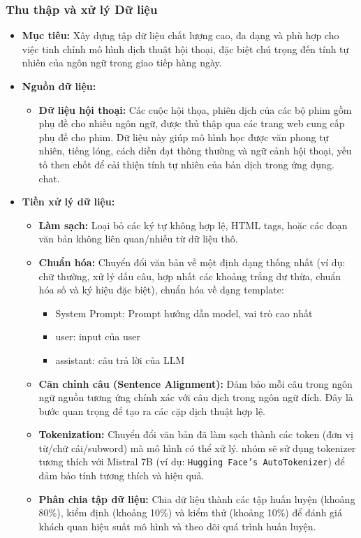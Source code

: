 \subsubsection{Thu thập và xử lý Dữ liệu}
\begin{itemize}
    \item \textbf{Mục tiêu:} Xây dựng tập dữ liệu chất lượng cao, đa dạng và phù hợp cho việc tinh chỉnh mô hình dịch thuật hội thoại, đặc biệt chú trọng đến tính tự nhiên của ngôn ngữ trong giao tiếp hàng ngày.
    \item \textbf{Nguồn dữ liệu:}
    \begin{itemize}
        \item \textbf{Dữ liệu hội thoại:} Các cuộc hội thọa, phiên dịch của các bộ phim gồm phụ đề cho nhiều ngôn ngữ, được thủ thập qua các trang web cung cấp phụ đề cho phim. Dữ liệu này giúp mô hình học được văn phong tự nhiên, tiếng lóng, cách diễn đạt thông thường và ngữ cảnh hội thoại, yếu tố then chốt để cải thiện tính tự nhiên của bản dịch trong ứng dụng.
chat.
    \end{itemize}
    \item \textbf{Tiền xử lý dữ liệu:}
    \begin{itemize}
        \item \textbf{Làm sạch:} Loại bỏ các ký tự không hợp lệ, HTML tags, hoặc các đoạn văn bản không liên quan/nhiễu từ dữ liệu thô.
        \item \textbf{Chuẩn hóa:} Chuyển đổi văn bản về một định dạng thống nhất (ví dụ: chữ thường, xử lý dấu câu, hợp nhất các khoảng trắng dư thừa, chuẩn hóa số và ký hiệu đặc biệt), chuẩn hóa về dạng template:
        \begin{itemize}
            \item System Prompt: Prompt hướng dẫn model, vai trò cao nhất
            \item user: input của user
            \item assistant: câu trả lời của LLM
        \end{itemize}
        \item \textbf{Căn chỉnh câu (Sentence Alignment):} Đảm bảo mỗi câu trong ngôn ngữ nguồn tương ứng chính xác với câu dịch trong ngôn ngữ đích. Đây là bước quan trọng để tạo ra các cặp dịch thuật hợp lệ.
        \item \textbf{Tokenization:} Chuyển đổi văn bản đã làm sạch thành các token (đơn vị từ/chữ cái/subword) mà mô hình có thể xử lý. nhóm sẽ sử dụng tokenizer tương thích với Mistral 7B (ví dụ: \texttt{Hugging Face's AutoTokenizer}) để đảm bảo tính tương thích và hiệu quả.
        \item \textbf{Phân chia tập dữ liệu:} Chia dữ liệu thành các tập huấn luyện (khoảng 80\%), kiểm định (khoảng 10\%) và kiểm thử (khoảng 10\%) để đánh giá khách quan hiệu suất mô hình và theo dõi quá trình huấn luyện.
    \end{itemize}
\end{itemize}


